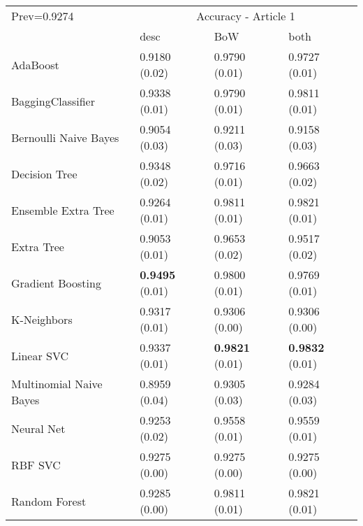 \begin{tabular}{|l|l|l|l| }
\hline
Prev=0.9274 &  \multicolumn{3}{c|}{Accuracy - Article 1} \\
\cline{2-4} & desc & BoW & both \\ \hline
AdaBoost                & 0.9180 (0.02) & 0.9790 (0.01) & 0.9727 (0.01)\\
BaggingClassifier       & 0.9338 (0.01) & 0.9790 (0.01) & 0.9811 (0.01)\\
Bernoulli Naive Bayes   & 0.9054 (0.03) & 0.9211 (0.03) & 0.9158 (0.03)\\
Decision Tree           & 0.9348 (0.02) & 0.9716 (0.01) & 0.9663 (0.02)\\
Ensemble Extra Tree     & 0.9264 (0.01) & 0.9811 (0.01) & 0.9821 (0.01)\\
Extra Tree              & 0.9053 (0.01) & 0.9653 (0.02) & 0.9517 (0.02)\\
Gradient Boosting       & {\bf 0.9495} (0.01) & 0.9800 (0.01) & 0.9769 (0.01)\\
K-Neighbors             & 0.9317 (0.01) & 0.9306 (0.00) & 0.9306 (0.00)\\
Linear SVC              & 0.9337 (0.01) & {\bf 0.9821} (0.01) & {\bf 0.9832} (0.01)\\
Multinomial Naive Bayes & 0.8959 (0.04) & 0.9305 (0.03) & 0.9284 (0.03)\\
Neural Net              & 0.9253 (0.02) & 0.9558 (0.01) & 0.9559 (0.01)\\
RBF SVC                 & 0.9275 (0.00) & 0.9275 (0.00) & 0.9275 (0.00)\\
Random Forest           & 0.9285 (0.00) & 0.9811 (0.01) & 0.9821 (0.01)\\
\hline
\end{tabular}